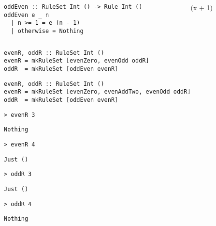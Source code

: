 \begin{frame}[fragile]
  \begin{columns}
    \begin{column}{0.5\textwidth}
  \begin{verbatim}
oddEven :: RuleSet Int () -> Rule Int ()
oddEven e _ n
  | n >= 1 = e (n - 1)
  | otherwise = Nothing
  \end{verbatim}
    \end{column}
    \begin{column}{0.5\textwidth}
          {~\left(x + 1\right)}
    \end{column}
  \end{columns}
\end{frame}


\begin{frame}[fragile]
  \begin{verbatim}
evenR, oddR :: RuleSet Int ()
evenR = mkRuleSet [evenZero, evenOdd oddR]
oddR  = mkRuleSet [oddEven evenR]
  \end{verbatim}
\end{frame}

\begin{frame}[fragile]
  \begin{verbatim}
evenR, oddR :: RuleSet Int ()
evenR = mkRuleSet [evenZero, evenAddTwo, evenOdd oddR]
oddR  = mkRuleSet [oddEven evenR]
  \end{verbatim}
\end{frame}

\begin{frame}[fragile]
  \onslide<+->
  \begin{verbatim}
> evenR 3
  \end{verbatim}
  \onslide<+->
  \begin{verbatim}
Nothing
  \end{verbatim}

  \onslide<+->
  \begin{verbatim}
> evenR 4
  \end{verbatim}
  \onslide<+->
  \begin{verbatim}
Just ()
  \end{verbatim}

  \onslide<+->
  \begin{verbatim}
> oddR 3
  \end{verbatim}
  \onslide<+->
  \begin{verbatim}
Just ()
  \end{verbatim}

  \onslide<+->
  \begin{verbatim}
> oddR 4
  \end{verbatim}
  \onslide<+->
  \begin{verbatim}
Nothing
  \end{verbatim}
\end{frame}
